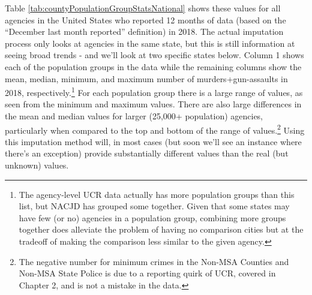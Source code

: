 \documentclass[
  12pt,
  openany]{book}
\begin{document}
Table \ref{tab:countyPopulationGroupStatsNational} shows these values for all agencies in the United States who reported 12 months of data (based on the ``December last month reported'' definition) in 2018. The actual imputation process only looks at agencies in the same state, but this is still information at seeing broad trends - and we'll look at two specific states below. Column 1 shows each of the population groups in the data while the remaining columns show the mean, median, minimum, and maximum number of murders+gun-assaults in 2018, respectively.\footnote{The agency-level UCR data actually has more population groups than this list, but NACJD has grouped some together. Given that some states may have few (or no) agencies in a population group, combining more groups together does alleviate the problem of having no comparison cities but at the tradeoff of making the comparison less similar to the given agency.} For each population group there is a large range of values, as seen from the minimum and maximum values. There are also large differences in the mean and median values for larger (25,000+ population) agencies, particularly when compared to the top and bottom of the range of values.\footnote{The negative number for minimum crimes in the Non-MSA Counties and Non-MSA State Police is due to a reporting quirk of UCR, covered in Chapter 2, and is not a mistake in the data.} Using this imputation method will, in most cases (but soon we'll see an instance where there's an exception) provide substantially different values than the real (but unknown) values.
\end{document}
